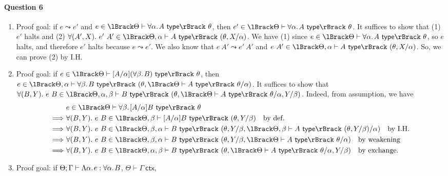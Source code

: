 \documentclass[11pt,a4paper,twoside]{article}
\begin{document}
\paragraph*{Question 6}
\begin{enumerate}[label=(\alph*)]
  \item Proof goal: if $e \leadsto e'$ and $e \in \sem{\Theta \vdash \fora{\alpha}{A}\ \type}\ \theta$,
    then $e' \in \sem{\Theta \vdash \fora{\alpha}{A}\ \type}\ \theta$.
    It suffices to show that (1) $e'$ halts and (2) $\forall (A', X).\ 
    e'\ A' \in \sem{\Theta, \alpha \vdash A\ \type}\ (\theta, X / \alpha)$. 
    We have (1) since $e \in \sem{\Theta \vdash \fora{\alpha}{A}\ \type}\ \theta$, so $e$ halts,
    and therefore $e'$ halts because $e \leadsto e'$.
    We also know that $e\ A' \leadsto e'\ A'$ and $e\ A' \in \sem{\Theta, \alpha \vdash A\ \type}\ (\theta, X / \alpha)$.
    So, we can prove (2) by I.H.
  \item Proof goal: if $e \in \sem{\Theta \vdash \sub{A / \alpha}{(\fora{\beta}{B})}\ \type}\ \theta$,
    then $e \in \sem{\Theta , \alpha \vdash \fora{\beta}{B}\ \type}\ (\theta, \sem{\Theta \vdash A\ \type}\ \theta / \alpha)$.
    It suffices to show that $\forall (B, Y).\ e\ B \in \sem{\Theta, \alpha, \beta \vdash B\ \type}\ (\theta, \sem{\Theta \vdash A\ \type}\ \theta / \alpha, Y / \beta)$.
    Indeed, from assumption, we have
    \begin{align*}
      & e \in \sem{\Theta \vdash \fora{\beta}{\sub{A / \alpha}{B}}\ \type}\ \theta\\
      \Longrightarrow\ & \forall (B, Y).\ e\ B \in \sem{\Theta, \beta \vdash \sub{A / \alpha}{B}\ \type}\ (\theta, Y / \beta) \quad \text{by def.}\\
      \Longrightarrow\ & \forall (B, Y).\ e\ B \in \sem{\Theta, \beta, \alpha \vdash {B}\ \type}\ (\theta, Y / \beta, \sem{\Theta, \beta \vdash A\ \type}\ (\theta,  Y / \beta) / \alpha) \quad \text{by I.H.}\\
      \Longrightarrow\ & \forall (B, Y).\ e\ B \in \sem{\Theta, \beta, \alpha \vdash {B}\ \type}\ (\theta, Y / \beta, \sem{\Theta \vdash A\ \type}\ \theta / \alpha) \quad \text{by weakening}\\
      \Longrightarrow\ & \forall (B, Y).\ e\ B \in \sem{\Theta, \alpha, \beta \vdash B\ \type}\ (\theta, \sem{\Theta \vdash A\ \type}\ \theta / \alpha, Y / \beta) \quad \text{by exchange.}
    \end{align*}
  \item Proof goal: if $\Theta; \Gamma \vdash \Lambda \alpha .\;\! e : \forall \alpha .\;\! B$, $\Theta \vdash \Gamma\ \mathsf{ctx}$,

\end{enumerate}
\end{document}
